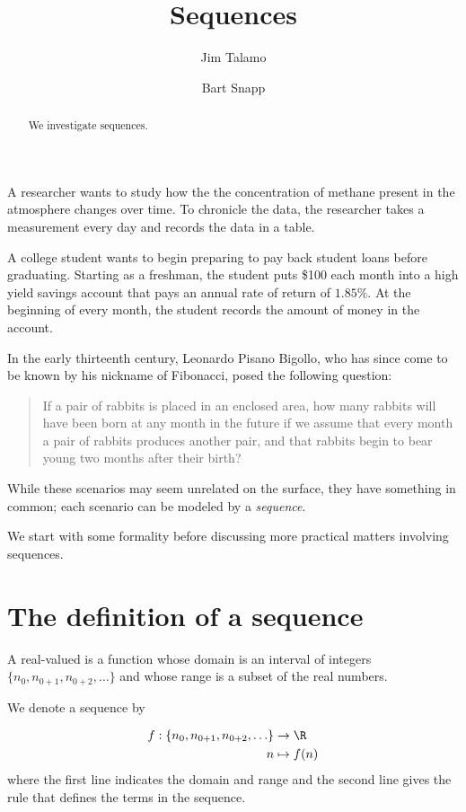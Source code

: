 \documentclass{ximera}
\author{Jim Talamo \and Bart Snapp}
\title[Dig-In:]{Sequences}
\begin{document}
\begin{abstract}
We investigate sequences.
\end{abstract}
\maketitle

A researcher wants to study how the the concentration of methane present in the atmosphere changes over time.  To chronicle the data, the researcher takes a measurement every day and records the data in a table.

A college student wants to begin preparing to pay back student loans before graduating.  Starting as a freshman, the student puts \$100 each month into a high yield savings account that pays an annual rate of return of $1.85\%$.  At the beginning of every month, the student records the amount of money in the account.

In the early thirteenth century, Leonardo Pisano Bigollo, who has since come to be known by his nickname of Fibonacci, posed the following question:

\begin{quote}
If a pair of rabbits is placed in an enclosed area, how many rabbits will have been born at any month in the future if we assume that every month a pair of rabbits produces another pair, and that rabbits begin to bear young two months after their birth?  
\end{quote}

While these scenarios may seem unrelated on the surface, they have something in common; each scenario can be modeled by a \emph{sequence}.

We start with some formality before discussing more practical matters involving sequences.

\section{The definition of a sequence}

\begin{definition} 
A real-valued  is a function whose domain is an interval of integers $\{n_0,n_{0+1},n_{0+2}, \ldots\}$ and whose range is a subset of the real numbers.  

We denote a sequence by 

\begin{align*}
f : \{n_0,n_{0+1},n_{0+2}, \ldots\} & \to \R \\
    n &\mapsto f(n)
\end{align*}
where the first line indicates the domain and range and the second line gives the rule that defines the terms in the sequence.
\end{definition}
\end{document}
